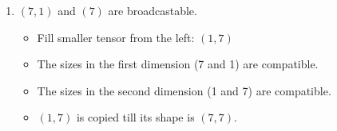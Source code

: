 \documentclass[9pt]{article}
\begin{document}
\begin{enumerate}
\item $(7,1)$ and $(7)$ are broadcastable.
\begin{itemize}
	\item Fill smaller tensor from the left: $(1,7)$
	\item The sizes in the first dimension (7 and 1) are compatible.
	\item The sizes in the second dimension (1 and 7) are compatible.
	\item $(1,7)$ is copied till its shape is $(7,7)$.
\end{itemize}

\end{enumerate}
\end{document}
